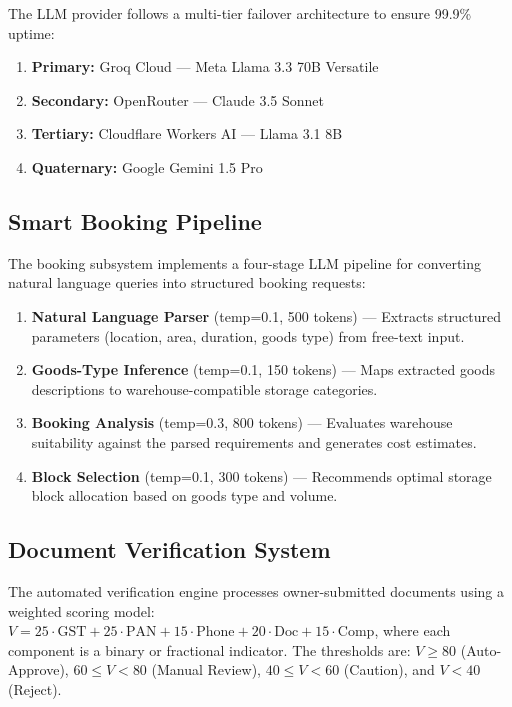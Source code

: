 The LLM provider follows a multi-tier failover architecture to ensure 99.9\% uptime:
\begin{enumerate}
    \item \textbf{Primary:} Groq Cloud — Meta Llama 3.3 70B Versatile
    \item \textbf{Secondary:} OpenRouter — Claude 3.5 Sonnet
    \item \textbf{Tertiary:} Cloudflare Workers AI — Llama 3.1 8B
    \item \textbf{Quaternary:} Google Gemini 1.5 Pro
\end{enumerate}

\subsection{Smart Booking Pipeline}

The booking subsystem implements a four-stage LLM pipeline for converting natural language queries into structured booking requests:

\begin{enumerate}
    \item \textbf{Natural Language Parser} (temp=0.1, 500 tokens) — Extracts structured parameters (location, area, duration, goods type) from free-text input.
    \item \textbf{Goods-Type Inference} (temp=0.1, 150 tokens) — Maps extracted goods descriptions to warehouse-compatible storage categories.
    \item \textbf{Booking Analysis} (temp=0.3, 800 tokens) — Evaluates warehouse suitability against the parsed requirements and generates cost estimates.
    \item \textbf{Block Selection} (temp=0.1, 300 tokens) — Recommends optimal storage block allocation based on goods type and volume.
\end{enumerate}

\subsection{Document Verification System}

The automated verification engine processes owner-submitted documents using a weighted scoring model:
$V = 25 \cdot \text{GST} + 25 \cdot \text{PAN} + 15 \cdot \text{Phone} + 20 \cdot \text{Doc} + 15 \cdot \text{Comp}$,
where each component is a binary or fractional indicator. The thresholds are: $V \geq 80$ (Auto-Approve), $60 \leq V < 80$ (Manual Review), $40 \leq V < 60$ (Caution), and $V < 40$ (Reject).

